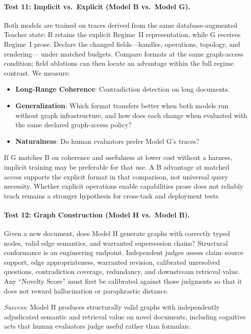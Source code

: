 \paragraph{Test 11: Implicit vs.\ Explicit (Model B vs.\ Model G).}
Both models are trained on traces derived from the same database-augmented
Teacher state: B retains the explicit Regime~II representation, while G
receives Regime~I prose. Declare the changed fields---handles, operations, topology, and rendering---
under matched budgets. Compare formats at the same graph-access condition;
field ablations can then locate an advantage within the full regime contrast. We measure:
\begin{itemize}
    \item \textbf{Long-Range Coherence}: Contradiction detection on long
    documents.
    \item \textbf{Generalization}: Which format transfers better when both
    models run without graph infrastructure, and how does each change when
    evaluated with the same declared graph-access policy?
    \item \textbf{Naturalness}: Do human evaluators prefer Model G's traces?
\end{itemize}
If G matches B on coherence and usefulness at lower cost without a harness,
implicit training may be preferable for that use. A B advantage at matched
access supports the explicit format in that comparison, not universal query
necessity. Whether explicit operations enable capabilities prose does not
reliably teach remains a stronger hypothesis for cross-task and deployment
tests.

\paragraph{Test 12: Graph Construction (Model H vs.\ Model B).}
Given a new document, does Model H generate graphs with correctly typed nodes,
valid edge semantics, and warranted supersession chains? Structural conformance
is an engineering endpoint. Independent judges assess claim--source support,
edge appropriateness, warranted revision, calibrated unresolved questions,
contradiction coverage, redundancy, and downstream retrieval value. Any
``Novelty Score'' must first be calibrated against those judgments so that it
does not reward hallucination or paraphrastic distance.

\emph{Success:} Model H produces structurally valid graphs with independently
adjudicated semantic and retrieval value on novel documents, including
cognitive acts that human evaluators judge useful rather than formulaic.

